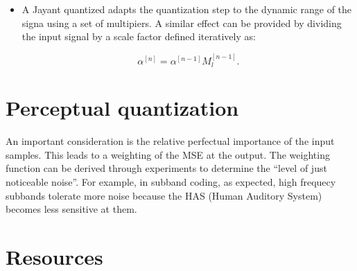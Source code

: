 \begin{itemize}
\item
  A Jayant quantized adapts the quantization step to the dynamic range
  of the signa using a set of multipiers. A similar effect can be
  provided by dividing the input signal by a scale factor defined
  iteratively as:

  \begin{equation}
    \alpha^{[n]} = \alpha^{[n-1]}M_l^{[n-1]}.
  \end{equation}
\end{itemize}


\section{Perceptual quantization}

An important consideration is the relative perfectual importance of
the input samples. This leads to a weighting of the MSE at the
output. The weighting function can be derived through experiments to
determine the ``level of just noticeable noise''. For example, in
subband coding, as expected, high frequecy subbands tolerate more
noise because the HAS (Human Auditory System) becomes less sensitive
at them.


\section{}

\section{Resources}

